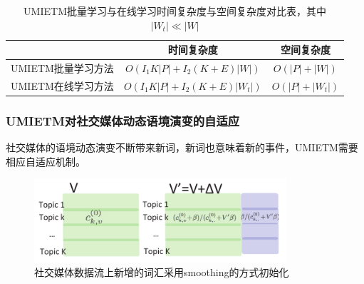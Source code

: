 \begin{frame}
\vspace{-1mm}

\begin{table}[ht]
	\setlength{\abovecaptionskip}{0.cm}
	\setlength{\belowcaptionskip}{0.cm}
	\caption{UMIETM批量学习与在线学习时间复杂度与空间复杂度对比表，其中\(|W_t| \ll |W|\)}
	\begin{tabular}{|l|c|c|}
	\hline
       & 时间复杂度 & 空间复杂度 \\ \hline
	UMIETM批量学习方法  & \(O(I_1 K|P|+I_2 (K+E)|W|)\) & \(O(|P|+|W|)\) \\ \hline
	UMIETM在线学习方法 & \(O(I_1 K|P|+I_2 (K+E)|W_t|)\) & \(O(|P|+|W_t|)\) \\
	\hline
	\end{tabular}
\end{table}


\end{frame}

\begin{frame}
\frametitle{\noindent UMIETM对社交媒体动态语境演变的自适应}
社交媒体的语境动态演变不断带来新词，新词也意味着新的事件，UMIETM需要相应自适应机制。

\begin{figure}
	\centering
	\includegraphics[height=3.1cm]{img/UMIETM/stream2.pdf}
	\caption{社交媒体数据流上新增的词汇采用smoothing的方式初始化}
\end{figure}
\end{frame}

